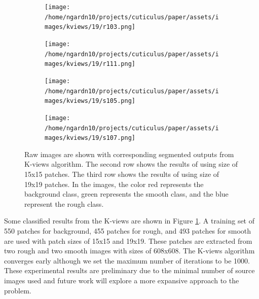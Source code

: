 \documentclass{aci}
\numberwithin{equation}{section}
\begin{document}
\begin{figure}
    \begin{subfigure}{\segmentedsubwidth}
        \texttt{[image: /home/ngardn10/projects/cuticulus/paper/assets/images/kviews/19/r103.png]}
    \end{subfigure}
    \begin{subfigure}{\segmentedsubwidth}
        \texttt{[image: /home/ngardn10/projects/cuticulus/paper/assets/images/kviews/19/r111.png]}
    \end{subfigure}
    \begin{subfigure}{\segmentedsubwidth}
        \texttt{[image: /home/ngardn10/projects/cuticulus/paper/assets/images/kviews/19/s105.png]}
    \end{subfigure}
    \begin{subfigure}{\segmentedsubwidth}
        \texttt{[image: /home/ngardn10/projects/cuticulus/paper/assets/images/kviews/19/s107.png]}
    \end{subfigure}
    \caption{Raw images are shown with corresponding segmented outputs from
        K-views algorithm. The second row shows the results of using size of
        15x15 patches. The third row shows the results of using size of 19x19
        patches. In the images, the color red represents the background class,
        green represents the smooth class, and the blue represent the rough
        class.}
    \label{fig:kviews_segmented}
\end{figure}

\FloatBarrier Some classified results from the K-views are shown in Figure
\ref{fig:kviews_segmented}. A training set of 550 patches for background, 455
patches for rough, and 493 patches for smooth are used with patch sizes of 15x15
and 19x19. These patches are extracted from two rough and two smooth images with
sizes of 608x608. The K-views algorithm converges early although we set the
maximum number of iterations to be 1000. These experimental results are
preliminary due to the minimal number of source images used and future work will
explore a more expansive approach to the problem.

\FloatBarrier
\end{document}
